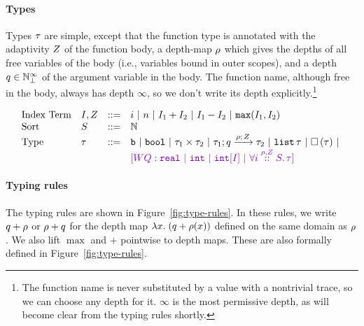 \documentclass[a4paper,11pt]{article}
\newcommand{\wq}[1]{\textcolor[rgb]{.50,0.0,0.7}{[WQ: #1]}}
\theoremstyle{definition}
\begin{document}
\paragraph{Types}
Types $\tau$ are simple, except that the function type is annotated
with the adaptivity $Z$ of the function body, a depth-map $\rho$
which gives the depths of all free variables of the body (i.e.,
variables bound in outer scopes), and a depth $q \in \mathbb{N}_{\bot}^\infty$ of
the argument variable in the body. The function name, although free in
the body, always has depth $\infty$, so we don't write its depth
explicitly.\footnote{The function name is never substituted by a value
  with a nontrivial trace, so we can choose any depth for it. $\infty$
  is the most permissive depth, as will become clear from the typing
  rules shortly.}

\[
\begin{array}{llll}
\mbox{Index Term} & \idx, \nnatA & ::= &     i ~|~ n ~|~ \idx_1 + \idx_2 ~|~  \idx_1
                                 - \idx_2 ~|~ \smax{\idx_1}{\idx_2}\\
  \mbox{Sort} & S & ::= & \nat \\
  \mbox{Type} & \type & ::= & \tbase ~|~ \tbool ~|~ \type_1 \times
  \type_2 ~|~ \tarr{\type_1}{\type_2}{\nnatbiA}{\dmap}{\nnatA} ~|~
                              \tlist{\type} ~|~ \tbox{\type} ~|~ \\
    & & & \wq{   \treal ~|~ \tint ~|~   \tint[I]  ~|~      \tforall{\dmap}{\nnatA}{i} \type  }
\end{array}
\]


\paragraph{Typing rules}
The typing rules are shown in Figure~\ref{fig:type-rules}. In these
rules, we write $q + \rho$ or $\rho + q$ for the depth
map $\lambda x.\;  (q + \rho(x))$ defined on the same domain as
$\rho$. We also lift $\max$ and $+$ pointwise to depth maps.
These are also formally defined in Figure~\ref{fig:type-rules}.
\end{document}
